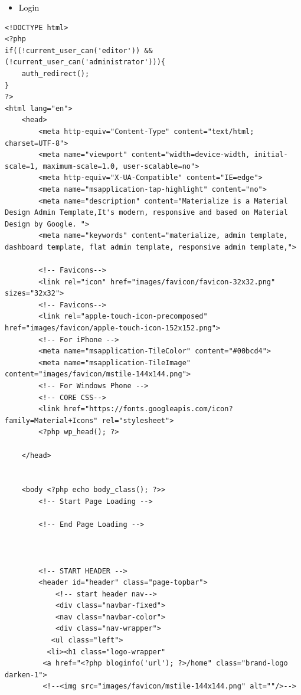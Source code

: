 \documentclass[a4paper,12pt]{article}
\begin{document}
\begin{itemize} 
\item Login
\end{itemize}
\begin{verbatim}
<!DOCTYPE html>
<?php
if((!current_user_can('editor')) && (!current_user_can('administrator'))){
    auth_redirect();
}
?> 
<html lang="en"> 
    <head>
        <meta http-equiv="Content-Type" content="text/html; charset=UTF-8">
        <meta name="viewport" content="width=device-width, initial-scale=1, maximum-scale=1.0, user-scalable=no">
        <meta http-equiv="X-UA-Compatible" content="IE=edge">
        <meta name="msapplication-tap-highlight" content="no">
        <meta name="description" content="Materialize is a Material Design Admin Template,It's modern, responsive and based on Material Design by Google. ">
        <meta name="keywords" content="materialize, admin template, dashboard template, flat admin template, responsive admin template,">

        <!-- Favicons-->
        <link rel="icon" href="images/favicon/favicon-32x32.png" sizes="32x32">
        <!-- Favicons-->
        <link rel="apple-touch-icon-precomposed" href="images/favicon/apple-touch-icon-152x152.png">
        <!-- For iPhone -->
        <meta name="msapplication-TileColor" content="#00bcd4">
        <meta name="msapplication-TileImage" content="images/favicon/mstile-144x144.png">
        <!-- For Windows Phone -->
        <!-- CORE CSS-->    
        <link href="https://fonts.googleapis.com/icon?family=Material+Icons" rel="stylesheet">
        <?php wp_head(); ?>

    </head>


    <body <?php echo body_class(); ?>>
        <!-- Start Page Loading -->

        <!-- End Page Loading -->

      

        <!-- START HEADER -->
        <header id="header" class="page-topbar">
            <!-- start header nav-->
            <div class="navbar-fixed"> 
            <nav class="navbar-color">
            <div class="nav-wrapper">
           <ul class="left">                      
          <li><h1 class="logo-wrapper"
         <a href="<?php bloginfo('url'); ?>/home" class="brand-logo darken-1">
         <!--<img src="images/favicon/mstile-144x144.png" alt=""/>-->


\end{verbatim}
\end{document}
